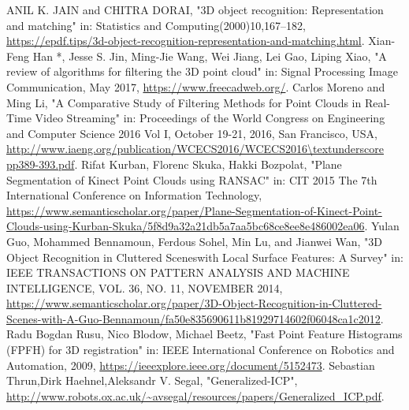 \begin{thebibliography}{1}
		ANIL K. JAIN and CHITRA DORAI,
		"3D object recognition: Representation and matching" in: Statistics and Computing(2000)10,167–182, \url{https://epdf.tips/3d-object-recognition-representation-and-matching.html}.
		Xian-Feng Han *, Jesse S. Jin, Ming-Jie Wang, Wei Jiang, Lei Gao, Liping Xiao,
		"A review of algorithms for filtering the 3D point cloud" in: Signal Processing Image Communication, May 2017, \url{https://www.freecadweb.org/}.
		Carlos Moreno and Ming Li,
		"A Comparative Study of Filtering Methods for Point Clouds in Real-Time Video Streaming" in: Proceedings of the World Congress on Engineering and Computer Science 2016 Vol I, October 19-21, 2016, San Francisco, USA, \url{http://www.iaeng.org/publication/WCECS2016/WCECS2016\textunderscore pp389-393.pdf}.
		Rifat Kurban, Florenc Skuka, Hakki Bozpolat,
		"Plane Segmentation of Kinect Point Clouds using RANSAC" in: CIT 2015 The 7th International Conference on Information Technology, \url{https://www.semanticscholar.org/paper/Plane-Segmentation-of-Kinect-Point-Clouds-using-Kurban-Skuka/5f8d9a32a21db5a7aa5bc68ce8ee8e486002ea06}.
		Yulan Guo, Mohammed Bennamoun, Ferdous Sohel, Min Lu, and Jianwei Wan,
		"3D Object Recognition in Cluttered Sceneswith Local Surface Features: A Survey" in: IEEE TRANSACTIONS ON PATTERN ANALYSIS AND MACHINE INTELLIGENCE,  VOL. 36,  NO. 11,  NOVEMBER 2014, \url{https://www.semanticscholar.org/paper/3D-Object-Recognition-in-Cluttered-Scenes-with-A-Guo-Bennamoun/fa50e835690611b81929714602f06048ca1c2012}.
		Radu Bogdan Rusu, Nico Blodow, Michael Beetz,
		"Fast Point Feature Histograms (FPFH) for 3D registration" in: IEEE International Conference on Robotics and Automation, 2009, \url{https://ieeexplore.ieee.org/document/5152473}.
		Sebastian Thrun,Dirk Haehnel,Aleksandr V. Segal,
		"Generalized-ICP", \url{http://www.robots.ox.ac.uk/~avsegal/resources/papers/Generalized_ICP.pdf}.	
\end{thebibliography}
